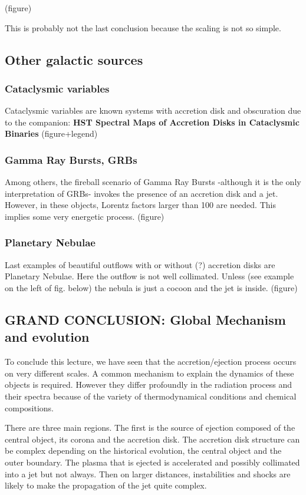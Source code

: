 \documentclass[10pt,a4paper,english]{article}
\begin{document}
(figure)

This is probably not the last conclusion because the scaling is not so simple.

\subsection{Other galactic sources}

\subsubsection{Cataclysmic variables}

Cataclysmic variables are known systems with accretion disk and obscuration due
to the companion: \textbf{HST Spectral Maps of Accretion Disks in Cataclysmic
Binaries} (figure+legend)

\subsubsection{Gamma Ray Bursts, GRBs}

Among others, the fireball scenario of Gamma Ray Bursts -although it is the
only interpretation of GRBs- invokes the presence of an accretion disk and a
jet. However, in these objects, Lorentz factors larger than 100 are needed.
This implies some very energetic process. (figure)

\subsubsection{Planetary Nebulae}

Last examples of beautiful outflows with or without (?) accretion disks are
Planetary Nebulae. Here the outflow is not well collimated. Unless (see example
on the left of fig. below) the nebula is just a cocoon and the jet is inside.
(figure)

\subsection{GRAND CONCLUSION: Global Mechanism and evolution}

To conclude this lecture, we have seen that the accretion/ejection process
occurs on very different scales. A common mechanism to explain the dynamics of
these objects is required. However they differ profoundly in the radiation
process and their spectra because of the variety of thermodynamical conditions
and chemical compositions.

There are three main regions. The first is the source of ejection composed of
the central object, its corona and the accretion disk. The accretion disk
structure can be complex depending on the historical evolution, the central
object and the outer boundary. The plasma that is ejected is accelerated and
possibly collimated into a jet but not always. Then on larger distances,
instabilities and shocks are likely to make the propagation of the jet quite
complex.
\end{document}
